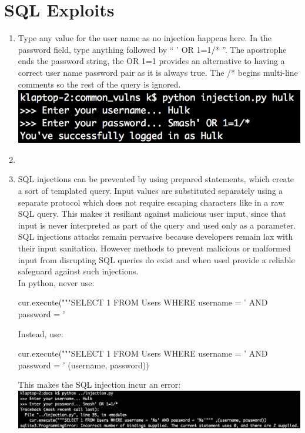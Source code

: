 \documentclass[9pt,a4paper]{article}
\begin{document}
\section{SQL Exploits}
\begin{enumerate}
\item Type any value for the user name as no injection happens here. In the password field, type anything followed by `` ' OR 1=1/* ''. The apostrophe ends the password string, the OR 1=1 provides an alternative to having a correct user name password pair as it is always true. The /* begins multi-line comments so the rest of the query is ignored.\\
\includegraphics[scale=0.6]{inject}
\item
\item SQL injections can be prevented by using prepared statements, which create a sort of templated query. Input values are substituted separately using a separate protocol which does not require escaping characters like in a raw SQL query. This makes it resiliant against malicious user input, since that input is never interpreted as part of the query and used only as a parameter. SQL injections attacks remain pervasive because developers remain lax with their input sanitation. However methods to prevent malicious or malformed input from disrupting SQL queries do exist and when used provide a reliable safeguard against such injections.\\

In python, never use:
\begin{python}
cur.execute("""SELECT 1 FROM Users
    WHERE username = '%
    AND password = '%
\end{python}
Instead, use:
\begin{python}
cur.execute("""SELECT 1 FROM Users
    WHERE username = '%
    AND password = '%
    (username, password))
\end{python}

This makes the SQL injection incur an error:\\
\includegraphics[scale=0.6]{inject_fixed}

\end{enumerate}
\end{document}
